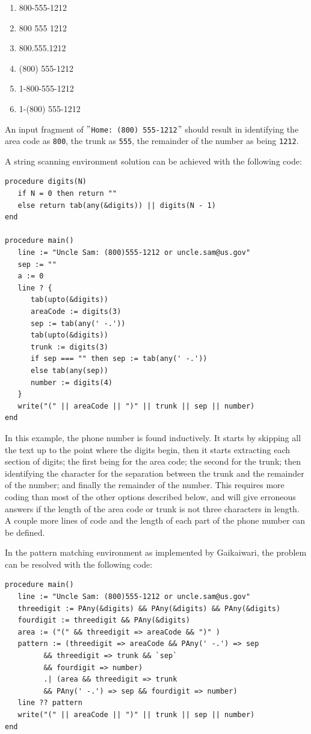 \documentclass{article}
\begin{document}
\begin{singlespace}
\begin{enumerate}
\item 800-555-1212
\item 800 555 1212
\item 800.555.1212
\item (800) 555-1212
\item 1-800-555-1212
\item 1-(800) 555-1212
\end{enumerate}
\end{singlespace}

An input fragment of $"$\texttt{Home: (800) 555-1212}$"$ should result in identifying the area code as \texttt{800}, the trunk as \texttt{555}, the remainder of the number as being \texttt{1212}.

A string scanning environment solution can be achieved with the following code:
\begin{verbatim}
procedure digits(N)
   if N = 0 then return ""
   else return tab(any(&digits)) || digits(N - 1)
end

procedure main()
   line := "Uncle Sam: (800)555-1212 or uncle.sam@us.gov"
   sep := ""
   a := 0
   line ? {
      tab(upto(&digits))
      areaCode := digits(3)
      sep := tab(any(' -.'))
      tab(upto(&digits))
      trunk := digits(3)
      if sep === "" then sep := tab(any(' -.'))
      else tab(any(sep))
      number := digits(4)
   }
   write("(" || areaCode || ")" || trunk || sep || number)
end
\end{verbatim}
In this example, the phone number is found inductively.  It starts by skipping all the text up to the point where the digits begin, then it starts extracting each section of digits; the first being for the area code; the second for the trunk; then identifying the character for the separation between the trunk and the remainder of the number; and finally the remainder of the number.  This requires more coding than most of the other options described below, and will give erroneous answers if the length of the area code or trunk is not three characters in length.  A couple more lines of code and the length of each part of the phone number can be defined.

In the pattern matching environment as implemented by Gaikaiwari, the problem can be resolved with the following code:
\begin{verbatim}
procedure main()
   line := "Uncle Sam: (800)555-1212 or uncle.sam@us.gov"
   threedigit := PAny(&digits) && PAny(&digits) && PAny(&digits)
   fourdigit := threedigit && PAny(&digits)
   area := ("(" && threedigit => areaCode && ")" )
   pattern := (threedigit => areaCode && PAny(' -.') => sep
         && threedigit => trunk && `sep`
         && fourdigit => number)
         .| (area && threedigit => trunk
         && PAny(' -.') => sep && fourdigit => number)
   line ?? pattern
   write("(" || areaCode || ")" || trunk || sep || number) 
end
\end{verbatim}
\end{document}
